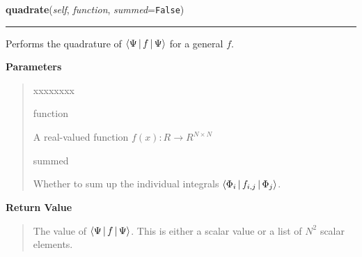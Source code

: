     \vspace{0.5ex}

\hspace{.8\funcindent}\begin{boxedminipage}{\funcwidth}

    \raggedright \textbf{quadrate}(\textit{self}, \textit{function}, \textit{summed}={\tt False})

    \vspace{-1.5ex}

    \rule{\textwidth}{0.5\fboxrule}
\setlength{\parskip}{2ex}
    Performs the quadrature of
    $\Braket{\Psi|f|\Psi}$
    for a general $f$.

\setlength{\parskip}{1ex}
      \textbf{Parameters}
      \vspace{-1ex}

      \begin{quote}
        \begin{Ventry}{xxxxxxxx}

          \item[function]

          A real-valued function $f(x):R \rightarrow R^{N \times N}$

          \item[summed]

          Whether to sum up the individual integrals
          $\Braket{\Phi_i|f_{i,j}|\Phi_j}$.

        \end{Ventry}

      \end{quote}

      \textbf{Return Value}
    \vspace{-1ex}

      \begin{quote}
      The value of
      $\Braket{\Psi|f|\Psi}$.
      This is either a scalar value or a list of $N^2$
      scalar elements.

      \end{quote}

    \end{boxedminipage}

    \label{HagedornMultiWavepacket:HagedornMultiWavepacket:matrix}

    \vspace{0.5ex}

